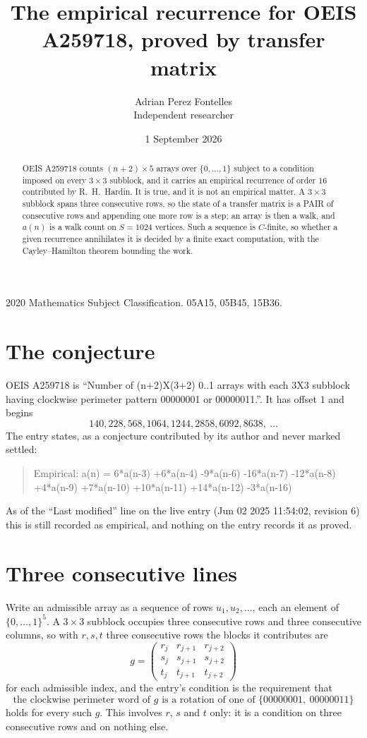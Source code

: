\documentclass[11pt,a4paper]{article}
\title{The empirical recurrence for OEIS A259718, proved by transfer matrix}
\author{Adrian Perez Fontelles\\ \small Independent researcher}
\date{1 September 2026}
\theoremstyle{plain}
\theoremstyle{definition}
\begin{document}
\maketitle

\begin{abstract}
OEIS A259718 counts $(n+2)\times5$ arrays over $\{0,\dots,1\}$ subject to a condition imposed on
every $3\times3$ subblock, and it carries an empirical recurrence of order $16$
contributed by R.~H.~Hardin. It is true, and it is not an empirical matter. A $3\times3$
subblock spans three consecutive rows, so the state of a transfer matrix is a PAIR of
consecutive rows and appending one more row is a step; an array is then a walk, and
$a(n)$ is a walk count on $S=1024$ vertices. Such a sequence is $C$-finite, so whether a given
recurrence annihilates it is decided by a finite exact computation, with the Cayley--Hamilton
theorem bounding the work.
\end{abstract}

\noindent\small 2020 Mathematics Subject Classification. 05A15, 05B45, 15B36.\normalsize

\section{The conjecture}

OEIS A259718 is ``Number of (n+2)X(3+2) 0..1 arrays with each 3X3 subblock having clockwise perimeter pattern 00000001 or 00000011.''. It has offset $1$ and begins
\[
140, 228, 568, 1064, 1244, 2858, 6092, 8638,\ \dots
\]
The entry states, as a conjecture contributed by its author and never marked settled:
\begin{quote}
Empirical: a(n) = 6*a(n-3) +6*a(n-4) -9*a(n-6) -16*a(n-7) -12*a(n-8) +4*a(n-9) +7*a(n-10) +10*a(n-11) +14*a(n-12) -3*a(n-16)
\end{quote}
As of the ``Last modified'' line on the live entry (Jun 02 2025 11:54:02, revision 6) this is still
recorded as empirical, and nothing on the entry records it as proved.

\section{Three consecutive lines}

Write an admissible array as a sequence of rows $u_1,u_2,\dots$, each an element of
$\{0,\dots,1\}^{5}$. A $3\times3$ subblock occupies three consecutive rows and
three consecutive columns, so with $r,s,t$ three consecutive rows the blocks it
contributes are
\[
g=\begin{pmatrix}r_j&r_{j+1}&r_{j+2}\\ s_j&s_{j+1}&s_{j+2}\\ t_j&t_{j+1}&t_{j+2}\end{pmatrix}
\]
for each admissible index, and the entry's condition is the requirement that
\[
\text{the clockwise perimeter word of }g\text{ is a rotation of one of }\{00000001,\ 00000011\}
\]
holds for every such $g$. This involves $r$, $s$ and $t$ only: it is a condition on
three consecutive rows and on nothing else.
\end{document}
